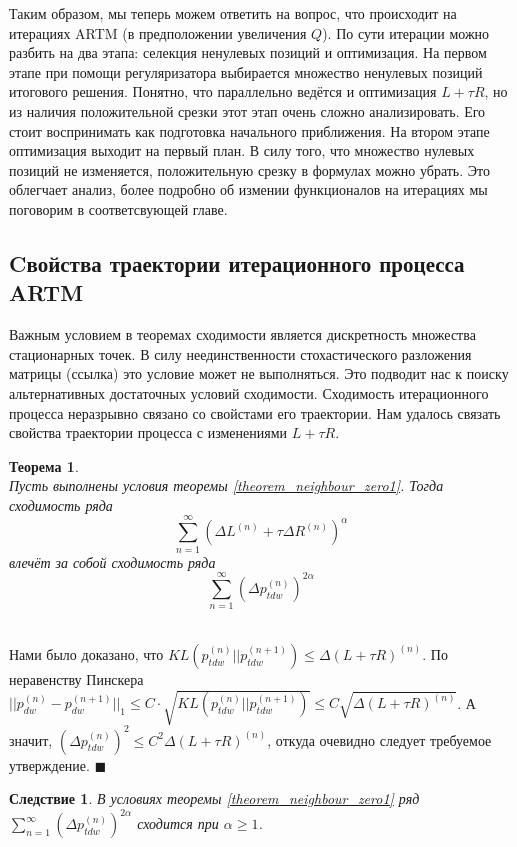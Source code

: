 \documentclass[12pt]{article}
\newtheorem{theorem}{Теорема}
\newtheorem{conseq}{Следствие}[theorem]
\newenvironment{Proof} 
	{\par\noindent{\bf Доказательство.}} 
	{\hfill$\blacksquare$}
\renewcommand{\leq}{\leqslant}
\renewcommand{\geq}{\geqslant}
\begin{document}
Таким образом, мы теперь можем ответить на вопрос, что происходит на итерациях ARTM (в предположении увеличения $Q$). По сути итерации можно разбить на два этапа: селекция ненулевых позиций и оптимизация. На первом этапе при помощи регуляризатора выбирается множество ненулевых позиций итогового решения. Понятно, что параллельно ведётся и оптимизация $L + \tau R$, но из наличия положительной срезки этот этап очень сложно анализировать. Его стоит воспринимать как подготовка начального приближения. На втором этапе оптимизация выходит на первый план. В силу того, что множество нулевых позиций не изменяется, положительную срезку в формулах можно убрать. Это облегчает анализ, более подробно об измении функционалов на итерациях мы поговорим в соответсвующей главе.

	\subsection{Cвойства траектории итерационного процесса ARTM}
Важным условием в теоремах сходимости является дискретность множества стационарных точек. В силу неединственности стохастического разложения матрицы (ссылка) это условие может не выполняться. Это подводит нас к поиску альтернативных достаточных условий сходимости. Сходимость итерационного процесса неразрывно связано со свойстами его траектории. Нам удалось связать свойства траектории процесса с изменениями $L + \tau R$.
\begin{theorem} \label{theorem_series}\ \\
	Пусть выполнены условия теоремы \ref{theorem_neighbour_zero1}. Тогда сходимость ряда
	\[
		\sum\limits_{n=1}^{\infty} (\Delta L^{(n)} + \tau \Delta R^{(n)})^{\alpha}
	\]
	влечёт за собой сходимость ряда
	\[
		\sum\limits_{n=1}^{\infty} (\Delta p_{tdw}^{(n)})^{2 \alpha}
	\]
\end{theorem}
\begin{Proof}\ \\
Нами было доказано, что $KL(p_{tdw}^{(n)}||p_{tdw}^{(n + 1)}) \leq \Delta (L + \tau R)^{(n)}$. По неравенству Пинскера $|| p_{dw}^{(n)} - p_{dw}^{(n+1)}||_1 \leq C \cdot \sqrt{KL(p_{tdw}^{(n)}||p_{tdw}^{(n+1)})} \leq C \sqrt{\Delta (L + \tau R)^{(n)}}$. А значит, $ (\Delta p_{tdw}^{(n)})^{2} \leq C^2 \Delta (L + \tau R)^{(n)} $, откуда очевидно следует требуемое утверждение.
\end{Proof}\ \\
\begin{conseq}
В условиях теоремы  \ref{theorem_neighbour_zero1} ряд  $\sum\limits_{n=1}^{\infty} (\Delta p_{tdw}^{(n)})^{2 \alpha}$ сходится при $\alpha \geq 1$.
\end{conseq}
\end{document}
